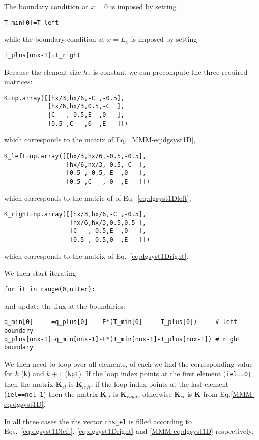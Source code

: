 The boundary condition at $x=0$ is imposed by setting
\begin{lstlisting}
T_min[0]=T_left
\end{lstlisting}
while the boundary condition at $x=L_x$ is imposed by setting
\begin{lstlisting}
T_plus[nnx-1]=T_right
\end{lstlisting}

Because the element size $h_x$ is constant we can precompute the three required matrices:
\begin{lstlisting}
K=np.array([[hx/3,hx/6,-C ,-0.5],
            [hx/6,hx/3,0.5,-C  ],
            [C   ,-0.5,E  ,0   ],
            [0.5 ,C   ,0  ,E   ]])
\end{lstlisting}
which corresponds to the matrix of Eq.~\eqref{MMM-eq:dgsyst1D},
\begin{lstlisting}
K_left=np.array([[hx/3,hx/6,-0.5,-0.5],
                 [hx/6,hx/3, 0.5,-C  ],
                 [0.5 ,-0.5, E  ,0   ],
                 [0.5 ,C   , 0  ,E   ]])
\end{lstlisting}
which corresponds to the matric of of Eq.~\eqref{eq:dgsyst1Dleft},
\begin{lstlisting}
K_right=np.array([[hx/3,hx/6,-C ,-0.5],
                  [hx/6,hx/3,0.5,0.5 ],
                  [C   ,-0.5,E  ,0   ],
                  [0.5 ,-0.5,0  ,E   ]])
\end{lstlisting}
which corresponds to the matrix of Eq.~\eqref{eq:dgsyst1Dright}.
 
We then start iterating
\begin{lstlisting}
for it in range(0,niter):
\end{lstlisting}
and update the flux at the boundaries:
\begin{lstlisting}
q_min[0]     =q_plus[0]   -E*(T_min[0]    -T_plus[0])     # left boundary
q_plus[nnx-1]=q_min[nnx-1]-E*(T_min[nnx-1]-T_plus[nnx-1]) # right boundary
\end{lstlisting}
We then need to loop over all elements, of each we find the corresponding
value for $k$ ({\tt k}) and $k+1$ ({\tt kp1}).
If the loop index points at the first element ({\tt iel==0})
then the matrix ${\bm K}_{el}$ is ${\bm K}_{left}$, 
if the loop index points at the last element ({\tt iel==nel-1})
then the matrix ${\bm K}_{el}$ is ${\bm K}_{right}$, 
otherwise ${\bm K}_{el}$ is ${\bm K}$ from Eq.\eqref{MMM-eq:dgsyst1D}.

In all three cases the rhs vector {\tt rhs\_el} is filled according to 
Eqs.~\eqref{eq:dgsyst1Dleft}, \eqref{eq:dgsyst1Dright} and \eqref{MMM-eq:dgsyst1D} respectively.

